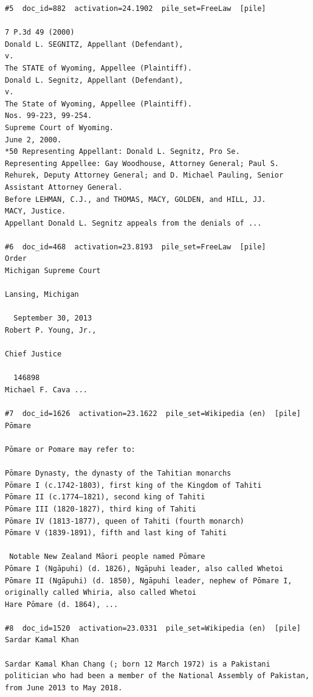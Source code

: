 \begin{verbatim}
#5  doc_id=882  activation=24.1902  pile_set=FreeLaw  [pile]

7 P.3d 49 (2000)
Donald L. SEGNITZ, Appellant (Defendant),
v.
The STATE of Wyoming, Appellee (Plaintiff).
Donald L. Segnitz, Appellant (Defendant),
v.
The State of Wyoming, Appellee (Plaintiff).
Nos. 99-223, 99-254.
Supreme Court of Wyoming.
June 2, 2000.
*50 Representing Appellant: Donald L. Segnitz, Pro Se.
Representing Appellee: Gay Woodhouse, Attorney General; Paul S. Rehurek, Deputy Attorney General; and D. Michael Pauling, Senior Assistant Attorney General.
Before LEHMAN, C.J., and THOMAS, MACY, GOLDEN, and HILL, JJ.
MACY, Justice.
Appellant Donald L. Segnitz appeals from the denials of ...

#6  doc_id=468  activation=23.8193  pile_set=FreeLaw  [pile]
Order                                                                                       Michigan Supreme Court
                                                                                                  Lansing, Michigan

  September 30, 2013                                                                                  Robert P. Young, Jr.,
                                                                                                                Chief Justice

  146898                                                                                              Michael F. Cava ...

#7  doc_id=1626  activation=23.1622  pile_set=Wikipedia (en)  [pile]
Pōmare

Pōmare or Pomare may refer to:

Pōmare Dynasty, the dynasty of the Tahitian monarchs
Pōmare I (c.1742-1803), first king of the Kingdom of Tahiti
Pōmare II (c.1774–1821), second king of Tahiti
Pōmare III (1820-1827), third king of Tahiti
Pōmare IV (1813-1877), queen of Tahiti (fourth monarch)
Pōmare V (1839-1891), fifth and last king of Tahiti

 Notable New Zealand Māori people named Pōmare
Pōmare I (Ngāpuhi) (d. 1826), Ngāpuhi leader, also called Whetoi
Pōmare II (Ngāpuhi) (d. 1850), Ngāpuhi leader, nephew of Pōmare I, originally called Whiria, also called Whetoi
Hare Pōmare (d. 1864), ...

#8  doc_id=1520  activation=23.0331  pile_set=Wikipedia (en)  [pile]
Sardar Kamal Khan

Sardar Kamal Khan Chang (; born 12 March 1972) is a Pakistani politician who had been a member of the National Assembly of Pakistan, from June 2013 to May 2018.


\end{verbatim}
